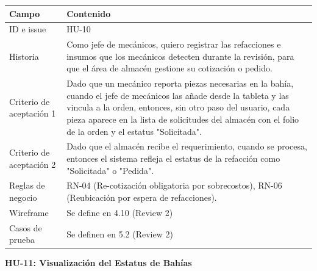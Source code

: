 {\def\LTcaptype{none} %
\begin{longtable}[]{@{}
  >{\raggedright\arraybackslash}p{}
  >{\raggedright\arraybackslash}p{}@{}}
\toprule\noalign{}
\begin{minipage}[b]{\linewidth}\raggedright
\textbf{Campo}
\end{minipage} & \begin{minipage}[b]{\linewidth}\raggedright
\textbf{Contenido}
\end{minipage} \\
\midrule\noalign{}
\endhead
\bottomrule\noalign{}
\endlastfoot
ID e issue & HU-10 \\
Historia & Como jefe de mecánicos, quiero registrar las refacciones e
insumos que los mecánicos detecten durante la revisión, para que el área
de almacén gestione su cotización o pedido. \\
Criterio de aceptación 1 & Dado que un mecánico reporta piezas
necesarias en la bahía, cuando el jefe de mecánicos las añade desde la
tableta y las vincula a la orden, entonces, sin otro paso del usuario,
cada pieza aparece en la lista de solicitudes del almacén con el folio
de la orden y el estatus "Solicitada". \\
Criterio de aceptación 2 & Dado que el almacén recibe el requerimiento,
cuando se procesa, entonces el sistema refleja el estatus de la
refacción como "Solicitada" o "Pedida". \\
Reglas de negocio & RN-04 (Re-cotización obligatoria por sobrecostos),
RN-06 (Reubicación por espera de refacciones). \\
Wireframe & Se define en 4.10 (Review 2) \\
Casos de prueba & Se definen en 5.2 (Review 2) \\
\end{longtable}
}

\textbf{HU-11: Visualización del Estatus de Bahías}

